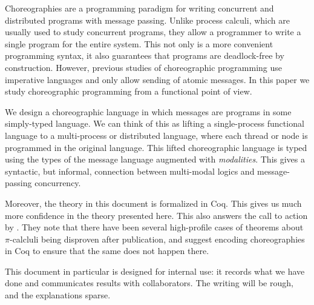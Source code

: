 Choreographies are a programming paradigm for writing concurrent and distributed programs with message passing.
Unlike process calculi, which are usually used to study concurrent programs, they allow a programmer to write a single program for the entire system.
This not only is a more convenient programming syntax, it also guarantees that programs are deadlock-free by construction.
However, previous studies of choreographic programming use imperative languages and only allow sending of atomic messages.
In this paper we study choreographic programming from a functional point of view.

We design a choreographic language in which messages are programs in some simply-typed language.
We can think of this as lifting a single-process functional language to a multi-process or distributed language, where each thread or node is programmed in the original language.
This lifted choreographic language is typed using the types of the message language augmented with \emph{modalities}.
This gives a syntactic, but informal, connection between multi-modal logics and message-passing concurrency.

Moreover, the theory in this document is formalized in Coq.
This gives us much more confidence in the theory presented here.
This also answers the call to action by \citet{Cruz-FilipeMP19}.
They note that there have been several high-profile cases of theorems about $\pi$-calcluli being disproven after publication, and suggest encoding choreographies in Coq to ensure that the same does not happen there.

This document in particular is designed for internal use: it records what we have done and communicates results with collaborators.
The writing will be rough, and the explanations sparse.

